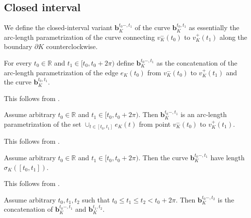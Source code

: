 \subsection{Closed interval}

We define the closed-interval variant \(\mathbf{b}_K^{t_0-, t_1}\) of the curve \(\mathbf{b}_K^{t_0, t_1}\) as essentially the arc-length parametrization of the curve connecting \(v_K^-(t_0)\) to \(v_K^+(t_1)\) along the boundary \(\partial K\) counterclockwise.

\begin{definition}

For every \(t_0 \in \mathbb{R}\) and \(t_1 \in [t_0, t_0 + 2\pi)\) define \(\mathbf{b}_K^{t_0-, t_1}\) as the concatenation of the arc-length parametrization of the edge \(e_K(t_0)\) from \(v_K^-(t_0)\) to \(v_K^+(t_1)\) and the curve \(\mathbf{b}_K^{t_0, t_1}\).

\label{def:closed-param}
\end{definition}

This follows from .

\begin{corollary}

Assume arbitrary \(t_0 \in \mathbb{R}\) and \(t_1 \in [t_0, t_0 + 2\pi)\). Then \(\mathbf{b}_K^{t_0-, t_1}\) is an arc-length parametrization of the set \(\cup_{t \in [t_0, t_1]} e_K(t)\) from point \(v_K^-(t_0)\) to \(v_K^+(t_1)\).

\label{cor:closed-param-segment}
\end{corollary}

This follows from .

\begin{corollary}

Assume arbitrary \(t_0 \in \mathbb{R}\) and \(t_1 \in [t_0, t_0 + 2\pi)\). Then the curve \(\mathbf{b}_K^{t_0-, t_1}\) have length \(\sigma_K([t_0, t_1])\).

\label{cor:closed-param-segment-length}
\end{corollary}

This follows from .

\begin{corollary}

Assume arbitrary \(t_0, t_1, t_2\) such that \(t_0 \leq t_1 \leq t_2 < t_0 + 2\pi\). Then \(\mathbf{b}_{K}^{t_0-, t_2}\) is the concatenation of \(\mathbf{b}_{K}^{t_0-, t_1}\) and \(\mathbf{b}_{K}^{t_1, t_2}\).

\label{cor:closed-param-concatenation}
\end{corollary}

